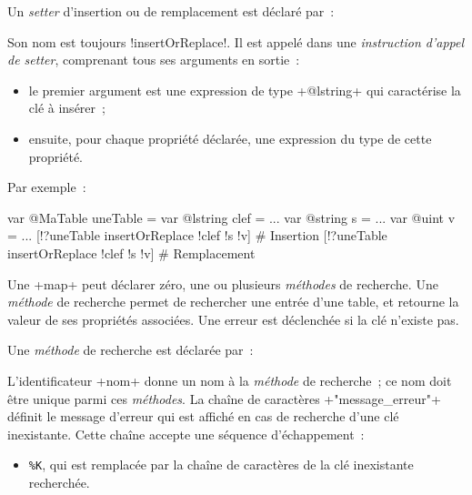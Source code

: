 Un \emph{setter} d'insertion ou de remplacement est déclaré par~:

\begin{galgas}
\end{galgas}

Son nom est toujours \ggs!insertOrReplace!. Il est appelé dans une \emph{instruction d'appel de setter}, comprenant tous ses arguments en sortie~:
\begin{itemize}
  \item le premier argument est une expression de type \ggs+@lstring+ qui caractérise la clé à insérer~;
  \item ensuite, pour chaque propriété déclarée, une expression du type de cette propriété.
\end{itemize}

Par exemple~:
\begin{galgas}
var @MaTable uneTable = {}
var @lstring clef = ...
var @string s = ...
var @uint v = ...
[!?uneTable insertOrReplace !clef !s !v] # Insertion
[!?uneTable insertOrReplace !clef !s !v] # Remplacement
\end{galgas}











Une \ggs+map+ peut déclarer zéro, une ou plusieurs \emph{méthodes} de recherche. Une \emph{méthode} de recherche permet de rechercher une entrée d'une table, et retourne la valeur de ses propriétés associées. Une erreur est déclenchée si la clé n'existe pas.


Une \emph{méthode} de recherche est déclarée par~:


\begin{galgas}
\end{galgas}

L'identificateur \ggs+nom+ donne un nom à la \emph{méthode} de recherche~; ce nom doit être unique parmi ces \emph{méthodes}. La chaîne de caractères \ggs+"message_erreur"+ définit le message d'erreur qui est affiché en cas de recherche d'une clé inexistante. Cette chaîne accepte une séquence d'échappement~:
\begin{itemize}
  \item \texttt{\%K}, qui est remplacée par la chaîne de caractères de la clé inexistante recherchée.
\end{itemize}


